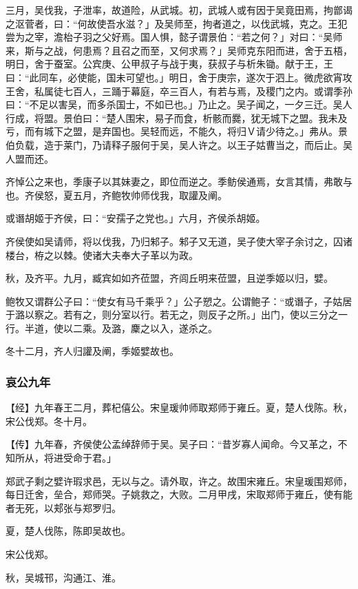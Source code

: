 \documentclass[]{article}
\begin{document}
三月，吴伐我，子泄率，故道险，从武城。初，武城人或有因于吴竟田焉，拘鄫谒之沤菅者，曰：``何故使吾水滋？」及吴师至，拘者道之，以伐武城，克之。王犯尝为之宰，澹枱子羽之父好焉。国人惧，懿子谓景伯：``若之何？」对曰：``吴师来，斯与之战，何患焉？且召之而至，又何求焉？」吴师克东阳而进，舍于五梧，明日，舍于蚕室。公宾庚、公甲叔子与战于夷，获叔子与析朱锄。献于王，王曰：``此同车，必使能，国未可望也。」明日，舍于庚宗，遂次于泗上。微虎欲宵攻王舍，私属徒七百人，三踊于幕庭，卒三百人，有若与焉，及稷门之内。或谓季孙曰：``不足以害吴，而多杀国士，不如已也。」乃止之。吴子闻之，一夕三迁。吴人行成，将盟。景伯曰：``楚人围宋，易子而食，析骸而爨，犹无城下之盟。我未及亏，而有城下之盟，是弃国也。吴轻而远，不能久，将归Ｖ请少待之。」弗从。景伯负载，造于莱门，乃请释子服何于吴，吴人许之。以王子姑曹当之，而后止。吴人盟而还。

齐悼公之来也，季康子以其妹妻之，即位而逆之。季鲂侯通焉，女言其情，弗敢与也。齐侯怒，夏五月，齐鲍牧帅师伐我，取讙及阐。

或谮胡姬于齐侯，曰：``安孺子之党也。」六月，齐侯杀胡姬。

齐侯使如吴请师，将以伐我，乃归邾子。邾子又无道，吴子使大宰子余讨之，囚诸楼台，栫之以棘。使诸大夫奉大子革以为政。

秋，及齐平。九月，臧宾如如齐莅盟，齐闾丘明来莅盟，且逆季姬以归，嬖。

鲍牧又谓群公子曰：``使女有马千乘乎？」公子愬之。公谓鲍子：``或谮子，子姑居于潞以察之。若有之，则分室以行。若无之，则反子之所。」出门，使以三分之一行。半道，使以二乘。及潞，麇之以入，遂杀之。

冬十二月，齐人归讙及阐，季姬嬖故也。

\hypertarget{header-n3134}{%
\subsubsection{哀公九年}\label{header-n3134}}

【经】九年春王二月，葬杞僖公。宋皇瑗帅师取郑师于雍丘。夏，楚人伐陈。秋，宋公伐郑。冬十月。

【传】九年春，齐侯使公孟绰辞师于吴。吴子曰：``昔岁寡人闻命。今又革之，不知所从，将进受命于君。」

郑武子剩之嬖许瑕求邑，无以与之。请外取，许之。故围宋雍丘。宋皇瑗围郑师，每日迁舍，垒合，郑师哭。子姚救之，大败。二月甲戌，宋取郑师于雍丘，使有能者无死，以郏张与郑罗归。

夏，楚人伐陈，陈即吴故也。

宋公伐郑。

秋，吴城邗，沟通江、淮。
\end{document}
